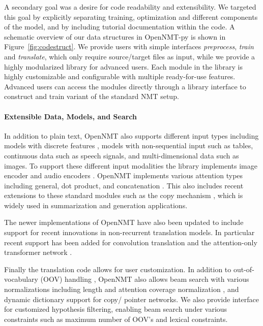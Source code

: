 \documentclass[]{article}
\begin{document}
A secondary goal was a desire for code readability and extensibility.
We targeted this goal by explicitly separating training, optimization and different components of the model, and by including tutorial documentation within
the code. A schematic overview of our data structures in OpenNMT-py is shown in Figure~\ref{fig:codestruct}. We provide users with simple interfaces \textit{preprocess}, \textit{train} and \textit{translate}, which only require source/target files as input, while we provide a highly modularized library for advanced users.  Each module in the library is highly customizable and configurable with multiple ready-for-use features. Advanced users can access the modules directly through a library interface to construct and train variant of the standard NMT setup.


\paragraph{Extensible Data, Models, and Search} In addition to plain text,
OpenNMT also supports different input types including models with
discrete features \citep{sennrich2016linguistic}, models with
non-sequential input such as tables, continuous data such as speech
signals, and multi-dimensional data such as images. To support these
different input modalities the library implements image encoder and
audio encoders \citep{DBLP:journals/corr/ChanJLV15}.  OpenNMT
implements various attention types including general, dot product, and
concatenation \citep{luong2015effective,britz2017massive}.  This also
includes recent extensions to these standard modules such as the copy
mechanism \citep{vinyals2015pointer,gu2016incorporating}, which is
widely used in summarization and generation applications.

The newer implementations of OpenNMT have also  been updated to
include support for recent innovations in  non-recurrent translation models. In
particular recent support has been added for convolution translation
\citep{gehring2017convolutional} and the attention-only transformer
network \citep{vaswani2017attention}.

Finally the translation code allows for user customization.
In addition to out-of-vocabulary
(OOV) handling \citep{Luong2015b}, OpenNMT also allows beam search
with various normalizations including length and attention coverage
normalization \citep{wu2016google}, and dynamic dictionary support for
copy/ pointer networks. We also provide interface for customized
hypothesis filtering, enabling beam search under various constraints
such as maximum number of OOV's and lexical constraints.
\end{document}
